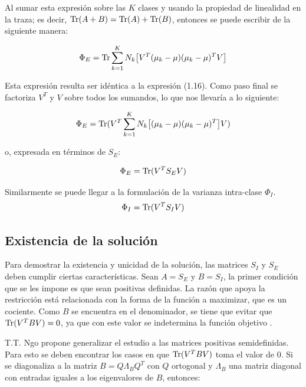 Al sumar esta expresión sobre las $K$ clases y usando la propiedad de linealidad en la traza; es decir, $\operatorname{Tr}(A+B) = \operatorname{Tr}(A)+\operatorname{Tr}(B)$, entonces se puede escribir de la siguiente manera:

\begin{equation*}
\Phi_E = \operatorname{Tr} \sum\limits_{k = 1}^{K} N_{k}  \big[ V^T (\mu_k - \mu) (\mu_k - \mu)^T V \big]
\end{equation*}


Esta expresión resulta ser idéntica a la expresión (1.16). Como paso final se factoriza $V^T$ y $V$ sobre todos los sumandos, lo que nos llevaría a lo siguiente:

\begin{equation*} 
\Phi_E =  \operatorname{Tr} (V^T \sum\limits_{k = 1}^{K} N_{k}  \big[(\mu_k - \mu) (\mu_k - \mu)^T \big] V)   
\end{equation*}

o, expresada en términos de $S_E$:

\begin{equation}\label{eq:2.19}
\Phi_E =  \operatorname{Tr} (V^T S_E V)     
\end{equation}

Similarmente se puede llegar a la formulación de la varianza intra-clase $\Phi_{I}$.
\begin{equation}\label{eq:2.20}
\Phi_{I} =  \operatorname{Tr} (V^T S_I V )
\end{equation}



\subsection{Existencia de la solución}

Para demostrar la existencia y unicidad de la solución, las matrices $S_I$ y $S_E$ deben cumplir ciertas características. Sean $A = S_E$ y $B = S_I$, la primer condición que se les impone es que sean positivas definidas. La razón que apoya la restricción está relacionada con la forma de la función a maximizar, que es un cociente. Como $B$ se encuentra en el denominador, se tiene que evitar que $\operatorname{Tr}(V^T B V) = 0$, ya que con este valor se indetermina la función objetivo \cite{ngo2012trace}. 

T.T. Ngo propone generalizar el estudio a las matrices positivas semidefinidas. Para esto se deben encontrar los casos en que $\operatorname{Tr}(V^T B V)$ toma el valor de $0$. Si se diagonaliza a la matriz $B = Q \Lambda_{B} Q^T$ con $Q$ ortogonal y $\Lambda_{B}$ una matriz diagonal con entradas iguales a los eigenvalores de $B$, entonces:

